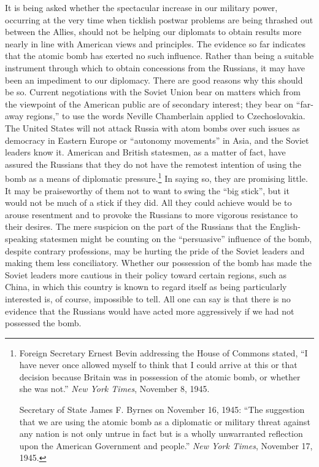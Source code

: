 It is being asked whether the spectacular increase in our military power, occurring at the very time when ticklish postwar problems are being thrashed out between the Allies, should not be helping our diplomats to obtain results more nearly in line with American views and principles. The evidence so far indicates that the atomic bomb has exerted no such influence. Rather than being a suitable instrument through which to obtain concessions from the Russians, it may have been an impediment to our diplomacy. There are good reasons why this should be so. Current negotiations with the Soviet Union bear on matters which from the viewpoint of the American public are of secondary interest; they bear on ``far-away regions,'' to use the words Neville Chamberlain applied to Czechoslovakia. The United States will not attack Russia with atom bombs over such issues as democracy in Eastern Europe or ``autonomy movements'' in Asia, and the Soviet leaders know it. American and British statesmen, as a matter of fact, have assured the Russians that they do not have the remotest intention of using the bomb as a means of diplomatic pressure.\footnote{Foreign Secretary Ernest Bevin addressing the House of Commons stated, ``I have never once allowed myself to think that I could arrive at this or that decision because Britain was in possession of the atomic bomb, or whether she was not.'' \textit{New York Times}, November 8, 1945.

Secretary of State James F. Byrnes on November 16, 1945: ``The suggestion that we are using the atomic bomb as a diplomatic or military threat against any nation is not only untrue in fact but is a wholly unwarranted reflection upon the American Government and people.'' \textit{New York Times}, November 17, 1945.} In saying so, they are promising little. It may be praiseworthy of them not to want to swing the ``big stick'', but it would not be much of a stick if they did. All they could achieve would be to arouse resentment and to provoke the Russians to more vigorous resistance to their desires. The mere suspicion on the part of the Russians that the English-speaking statesmen might be counting on the ``persuasive'' influence of the bomb, despite contrary professions, may be hurting the pride of the Soviet leaders and making them less conciliatory. Whether our possession of the bomb has made the Soviet leaders more cautious in their policy toward certain regions, such as China, in which this country is known to regard itself as being particularly interested is, of course, impossible to tell. All one can say is that there is no evidence that the Russians would have acted more aggressively if we had not possessed the bomb.

